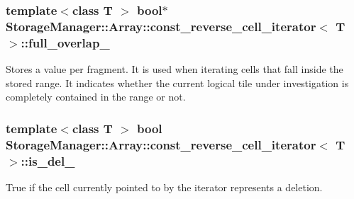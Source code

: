 \subsubsection[{full\+\_\+overlap\+\_\+}]{\setlength{\rightskip}{0pt plus 5cm}template$<$class T $>$ bool$\ast$ {\bf Storage\+Manager\+::\+Array\+::const\+\_\+reverse\+\_\+cell\+\_\+iterator}$<$ T $>$\+::full\+\_\+overlap\+\_\+\hspace{0.3cm}{\ttfamily [private]}}\label{classStorageManager_1_1Array_1_1const__reverse__cell__iterator_aad2b6034087c122241059f16bf6131b1}
Stores a value per fragment. It is used when iterating cells that fall inside the stored range. It indicates whether the current logical tile under investigation is completely contained in the range or not. \hypertarget{classStorageManager_1_1Array_1_1const__reverse__cell__iterator_ae3e2b057d538114638ac0ac0476a8ba8}{}
\subsubsection[{is\+\_\+del\+\_\+}]{\setlength{\rightskip}{0pt plus 5cm}template$<$class T $>$ bool {\bf Storage\+Manager\+::\+Array\+::const\+\_\+reverse\+\_\+cell\+\_\+iterator}$<$ T $>$\+::is\+\_\+del\+\_\+\hspace{0.3cm}{\ttfamily [private]}}\label{classStorageManager_1_1Array_1_1const__reverse__cell__iterator_ae3e2b057d538114638ac0ac0476a8ba8}
True if the cell currently pointed to by the iterator represents a deletion. \hypertarget{classStorageManager_1_1Array_1_1const__reverse__cell__iterator_af6bad4e1e24814785b6ddca558735a24}{}
